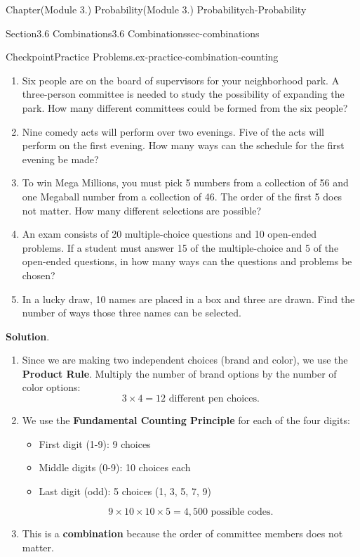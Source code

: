\documentclass[oneside,10pt,]{book}
\newcommand{\blocktitlefont}{\relax}
\newcommand{\ptxlistdisc}{\raisebox{0.3ex}{\textbullet}}
\newcommand{\terminology}[1]{\textbf{#1}}
\begin{document}
\begin{chapterptx}{Chapter}{(Module 3.) Probability}{}{(Module 3.) Probability}{}{}{ch-Probability}
\begin{sectionptx}{Section}{3.6 Combinations}{}{3.6 Combinations}{}{}{sec-combinations}
\begin{inlineexercise}{Checkpoint}{Practice Problems.}{ex-practice-combination-counting}
\begin{enumerate}
\item{}Six people are on the board of supervisors for your neighborhood park. A three-person committee is needed to study the possibility of expanding the park. How many different committees could be formed from the six people?%
\item{}Nine comedy acts will perform over two evenings. Five of the acts will perform on the first evening. How many ways can the schedule for the first evening be made?%
\item{}To win Mega Millions, you must pick 5 numbers from a collection of 56 and one Megaball number from a collection of 46. The order of the first 5 does not matter. How many different selections are possible?%
\item{}An exam consists of 20 multiple-choice questions and 10 open-ended problems. If a student must answer 15 of the multiple-choice and 5 of the open-ended questions, in how many ways can the questions and problems be chosen?%
\item{}In a lucky draw, 10 names are placed in a box and three are drawn. Find the number of ways those three names can be selected.%
\end{enumerate}
\par\smallskip%
\noindent\textbf{\blocktitlefont Solution}.\hypertarget{ex-practice-combination-counting-3}{}\quad{}%
\begin{enumerate}
\item{}Since we are making two independent choices (brand and color), we use the \terminology{Product Rule}. Multiply the number of brand options by the number of color options:%
\begin{equation*}
3 \times 4 = 12 \text{ different pen choices.}
\end{equation*}
%
\item{}We use the \terminology{Fundamental Counting Principle} for each of the four digits:%
\begin{itemize}[label=\ptxlistdisc]
\item{}First digit (1-9): 9 choices%
\item{}Middle digits (0-9): 10 choices each%
\item{}Last digit (odd): 5 choices (1, 3, 5, 7, 9)%
\end{itemize}
%
\begin{equation*}
9 \times 10 \times 10 \times 5 = 4,500 \text{ possible codes.}
\end{equation*}
%
\item{}This is a \terminology{combination} because the order of committee members does not matter.%

\end{enumerate}
\end{inlineexercise}
\end{sectionptx}
\end{chapterptx}
\end{document}
